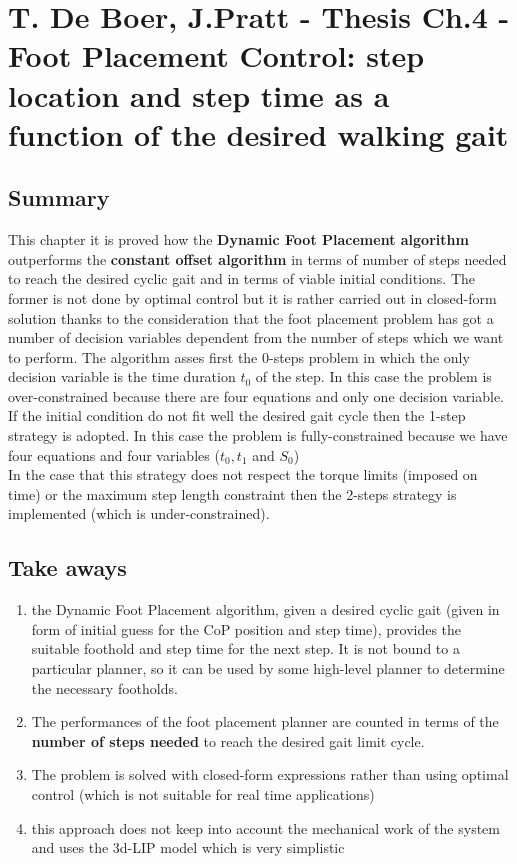 \section{T. De Boer, J.Pratt - Thesis Ch.4 - Foot Placement Control: step location and step time as a function of the desired walking gait}
\subsection*{Summary}

This chapter it is proved how the \textbf{Dynamic Foot Placement algorithm} outperforms the \textbf{constant offset algorithm} in terms of number of steps needed to reach the desired cyclic gait and in terms of viable initial conditions. The former is not done by optimal control but it is rather carried out in closed-form solution thanks to the consideration that the foot placement problem has got a number of decision variables dependent from the number of steps which we want to perform. The algorithm asses first the 0-steps problem in which the only decision variable is the time duration $t_0$ of the step. In this case the problem is over-constrained because there are four equations and only one decision variable.\\
If the initial condition do not fit well the desired gait cycle then the 1-step strategy is adopted. In this case the problem is fully-constrained because we have four equations and four variables ($t_0, t_1$ and $S_0$)\\
In the case that this strategy does not respect the torque limits (imposed on time) or the maximum step length constraint then the 2-steps strategy is implemented (which is under-constrained).

\subsection*{Take aways}
\begin{enumerate}
\item the Dynamic Foot Placement algorithm, given a desired cyclic gait (given in form of initial guess for the CoP position and step time), provides the suitable foothold and step time for the next step. It is not bound to a particular planner, so it can be used by some high-level planner to determine the necessary footholds.
\item The performances of the foot placement planner are counted in terms of the \textbf{number of steps needed} to reach the desired gait limit cycle.
\item The problem is solved with closed-form expressions rather than using optimal control (which is not suitable for real time applications)
\item this approach does not keep into account the mechanical work of the system and uses the 3d-LIP model which is very simplistic

\end{enumerate}
